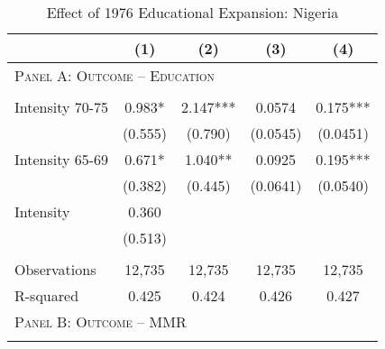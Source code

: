 \begin{subtables}\begin{table}[htpb!]\begin{center}\caption{Effect of 1976 Educational Expansion: Nigeria}\label{MMRtab:Nigeria}\begin{tabular}{p{5cm}cccc}\toprule&(1)&(2)&(3)&(4)\\ \midrule\multicolumn{5}{l}{\textsc{Panel A: Outcome -- Education}}\\\begin{footnotesize}\end{footnotesize}&\begin{footnotesize}\end{footnotesize}&\begin{footnotesize}\end{footnotesize}&\begin{footnotesize}\end{footnotesize}\\ 
Intensity 70-75&0.983*&2.147***&0.0574&0.175***\\ 
               &(0.555)&(0.790)&(0.0545)&(0.0451)\\ 
Intensity 65-69&0.671*&1.040**&0.0925&0.195***\\ 
               &(0.382)&(0.445)&(0.0641)&(0.0540)\\ 
Intensity      &0.360&&&\\ 
               &(0.513)&&&\\ 
\begin{footnotesize}\end{footnotesize}&\begin{footnotesize}\end{footnotesize}&\begin{footnotesize}\end{footnotesize}&\begin{footnotesize}\end{footnotesize}\\ 
Observations&12,735&12,735&12,735&12,735\\ 
R-squared&0.425&0.424&0.426&0.427\\ \midrule 
\multicolumn{5}{l}{\textsc{Panel B: Outcome -- MMR}}\\ 
\begin{footnotesize}\end{footnotesize}&\begin{footnotesize}\end{footnotesize}&\begin{footnotesize}\end{footnotesize}&\begin{footnotesize}\end{footnotesize}\\ 

\end{tabular}
\end{center}
\end{table}
\end{subtables}
